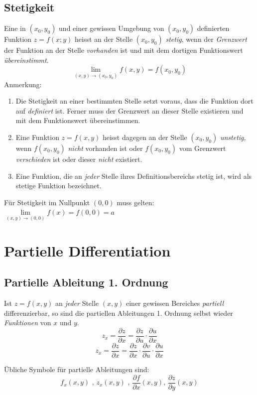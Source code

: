 \subsection{Stetigkeit}
\begin{definition}
Eine in $(x_0,y_0)$ und einer gewissen Umgebung von $(x_0,y_0)$ definierten Funktion $z = f(x;y)$ heisst an der Stelle $(x_0,y_0)$ \textit{stetig}, wenn der \textit{Grenzwert} der Funktion an der Stelle \textit{vorhanden} ist und mit dem dortigen Funktionswert \textit{übereinstimmt}.
$$\lim\limits_{(x,y) \rightarrow (x_0,y_0)} f(x,y) = f(x_0,y_0)$$
Anmerkung:
\begin{enumerate}
\item Die Stetigkeit an einer bestimmten Stelle setzt voraus, dass die Funktion dort auf \textit{definiert} ist. Ferner muss der Grenzwert an dieser Stelle existieren und mit dem Funktionswert übereinstimmen.
\item Eine Funktion $z = f(x,y)$ heisst dagegen an der Stelle $(x_0,y_0)$ \textit{unstetig}, wenn  $f(x_0,y_0)$ \textit{nicht} vorhanden ist oder $f(x_0,y_0)$ vom Grenzwert \textit{verschieden} ist oder dieser \textit{nicht} existiert.
\item Eine Funktion, die an \textit{jeder} Stelle ihres Definitionsbereichs stetig ist, wird als stetige Funktion bezeichnet.
\end{enumerate}
\end{definition}

Für Stetigkeit im Nullpunkt $(0, 0)$ muss gelten: $\lim\limits_{(x,y) \rightarrow (0,0)} f(x) = f(0,0) = a$


\section{Partielle Differentiation}
\subsection{Partielle Ableitung 1. Ordnung}
\begin{definition}
Ist $z = f(x,y)$ an \textit{jeder} Stelle $(x,y)$ einer gewissen Bereiches \textit{partiell} differenzierbar, so sind die partiellen Ableitungen 1. Ordnung selbst wieder \textit{Funktionen} von $x$ und $y$. 
$$ z_x = \frac{\partial z}{\partial x} = \frac{\partial z}{\partial u} \cdot \frac{\partial u}{\partial x}$$
$$ z_x = \frac{\partial z}{\partial x} = \frac{\partial z}{\partial x} \cdot \frac{\partial v}{\partial u} \cdot \frac{\partial u}{\partial x}$$

Übliche Symbole für partielle Ableitungen sind:
$$f_x(x, y) \text{ , } z_x(x, y) \text{ , } \frac{\partial f}{\partial x} (x, y) \text{, } \frac{\partial z}{\partial y} (x, y)$$
\end{definition}

